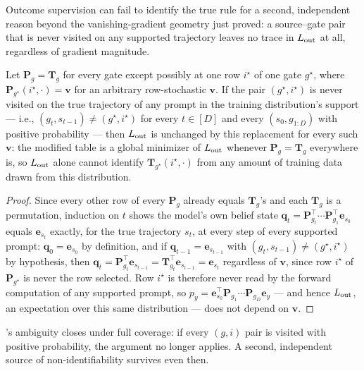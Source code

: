 Outcome supervision can fail to identify the true rule for a second,
independent reason beyond the vanishing-gradient geometry just proved: a
source--gate pair that is never visited on any supported trajectory leaves
no trace in $L_{\rm out}$ at all, regardless of gradient magnitude.

\begin{proposition}
\label{prop:outcome-nonidentifiability}
Let $\bm{P}_g=\bm{T}_g$ for every gate except possibly at one row $i^\star$ of
one gate $g^\star$, where $\bm{P}_{g^\star}(i^\star,\cdot)=\bm{v}$ for an
arbitrary row-stochastic $\bm{v}$. If the pair $(g^\star,i^\star)$ is never
visited on the true trajectory of any prompt in the training distribution's
support --- i.e., $(g_t,s_{t-1})\ne(g^\star,i^\star)$ for every $t\in[D]$ and
every $(s_0,g_{1:D})$ with positive probability --- then $L_{\rm out}$ is
unchanged by this replacement for every such $\bm{v}$: the modified table is
a global minimizer of $L_{\rm out}$ whenever $\bm{P}_g=\bm{T}_g$ everywhere
is, so $L_{\rm out}$ alone cannot identify $\bm{T}_{g^\star}(i^\star,\cdot)$
from any amount of training data drawn from this distribution.
\end{proposition}
\begin{proof}
Since every other row of every $\bm{P}_g$ already equals $\bm{T}_g$'s and each
$\bm{T}_g$ is a permutation, induction on $t$ shows the model's own belief
state $\bm{q}_t=\bm{P}_{g_t}^\top\cdots\bm{P}_{g_1}^\top\bm{e}_{s_0}$ equals
$\bm{e}_{s_t}$ exactly, for the true trajectory $s_t$, at every step of
every supported prompt: $\bm{q}_0=\bm{e}_{s_0}$ by definition, and if
$\bm{q}_{t-1}=\bm{e}_{s_{t-1}}$ with $(g_t,s_{t-1})\ne(g^\star,i^\star)$ by
hypothesis, then $\bm{q}_t=\bm{P}_{g_t}^\top\bm{e}_{s_{t-1}}=\bm{T}_{g_t}^\top
\bm{e}_{s_{t-1}}=\bm{e}_{s_t}$ regardless of $\bm{v}$, since row $i^\star$ of
$\bm{P}_{g^\star}$ is never the row selected. Row $i^\star$ is therefore
never read by the forward computation of any supported prompt, so
$p_y=\bm{e}_{s_0}^\top\bm{P}_{g_1}\cdots\bm{P}_{g_D}\bm{e}_y$ --- and hence
$L_{\rm out}$, an expectation over this same distribution --- does not
depend on $\bm{v}$.
\end{proof}

's ambiguity closes under full
coverage: if every $(g,i)$ pair is visited with positive probability, the
argument no longer applies. A second, independent source of
non-identifiability survives even then.

